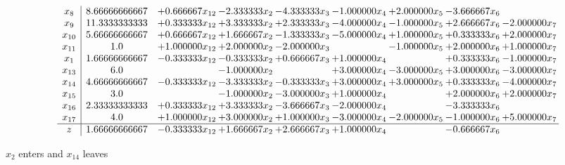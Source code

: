 \documentclass[10pt]{article}
\begin{document}
 \[\begin{array}{c| c c@{\hskip 2pt} c@{\hskip 2pt} c@{\hskip 2pt} c@{\hskip 2pt} c@{\hskip 2pt} c@{\hskip 2pt} c@{\hskip 2pt} }
 x_{8}   &  8.66666666667 & + 0.666667 x_{12} & -2.333333 x_{2} & -4.333333 x_{3} & -1.000000 x_{4} & + 2.000000 x_{5} & -3.666667 x_{6} &   \\
 x_{9}   &  11.3333333333 & + 0.333333 x_{12} & + 3.333333 x_{2} & + 2.333333 x_{3} & -4.000000 x_{4} & -1.000000 x_{5} & + 2.666667 x_{6} & -2.000000 x_{7}\\
 x_{10}   &  5.66666666667 & + 0.666667 x_{12} & + 1.666667 x_{2} & -1.333333 x_{3} & -5.000000 x_{4} & + 1.000000 x_{5} & + 0.333333 x_{6} & + 2.000000 x_{7}\\
 x_{11}   &  1.0 & + 1.000000 x_{12} & + 2.000000 x_{2} & -2.000000 x_{3} &   & -1.000000 x_{5} & + 2.000000 x_{6} & + 1.000000 x_{7}\\
 x_{1}   &  1.66666666667 & -0.333333 x_{12} & -0.333333 x_{2} & + 0.666667 x_{3} & + 1.000000 x_{4} &   & + 0.333333 x_{6} & -1.000000 x_{7}\\
 x_{13}   &  6.0  &   & -1.000000 x_{2} &   & + 3.000000 x_{4} & -3.000000 x_{5} & + 3.000000 x_{6} & -3.000000 x_{7}\\
 x_{14}   &  4.66666666667 & -0.333333 x_{12} & -3.333333 x_{2} & -0.333333 x_{3} & + 3.000000 x_{4} & + 3.000000 x_{5} & + 0.333333 x_{6} & -4.000000 x_{7}\\
 x_{15}   &  3.0  &   & -1.000000 x_{2} & -3.000000 x_{3} & + 1.000000 x_{4} &   & + 2.000000 x_{6} & + 2.000000 x_{7}\\
 x_{16}   &  2.33333333333 & + 0.333333 x_{12} & + 3.333333 x_{2} & -3.666667 x_{3} & -2.000000 x_{4} &   & -3.333333 x_{6} &   \\
 x_{17}   &  4.0 & + 1.000000 x_{12} & + 3.000000 x_{2} & + 1.000000 x_{3} & -3.000000 x_{4} & -2.000000 x_{5} & -1.000000 x_{6} & + 5.000000 x_{7}\\
\hline
z    &  1.66666666667 & -0.333333 x_{12} & + 1.666667 x_{2} & + 2.666667 x_{3} & + 1.000000 x_{4} &   & -0.666667 x_{6} &   \\
\end{array}\]


 $ x_{2} $ enters and $ x_{14} $ leaves 
\end{document}
